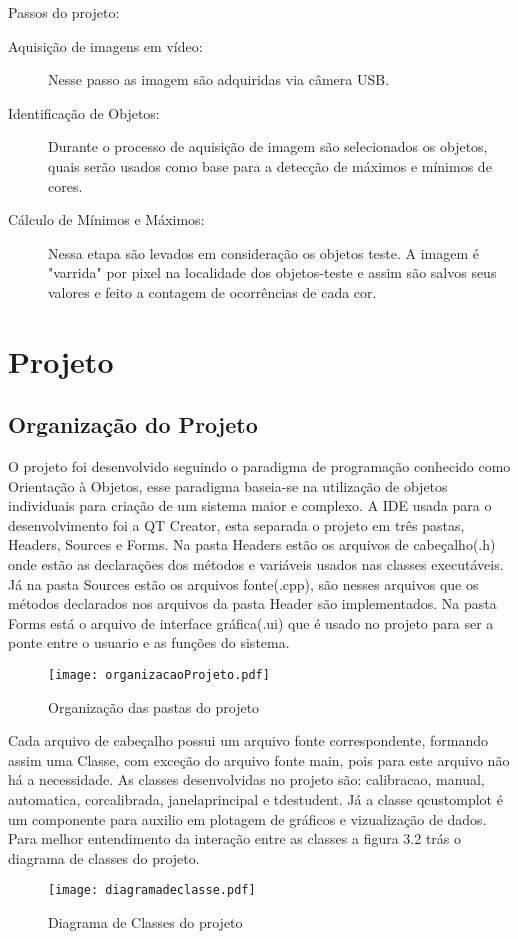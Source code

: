 	
	Passos do projeto:
	\begin{description}
		\item[Aquisição de imagens em vídeo:] Nesse passo as imagem são adquiridas via câmera USB.
		
		\item[Identificação de Objetos:]
				 Durante o processo de aquisição de imagem são selecionados os objetos, quais serão usados como base para a detecção de máximos e mínimos de cores.
		\item [Cálculo de Mínimos e Máximos:]
		 Nessa etapa são levados em consideração os objetos teste. A imagem é "varrida"  por pixel na localidade dos objetos-teste e assim são salvos seus valores e feito a contagem de ocorrências de cada cor.		
	\end{description}


	\section{Projeto}
	\subsection{Organização do Projeto}
	 O projeto foi desenvolvido seguindo o paradigma de programação conhecido como  Orientação à Objetos, esse paradigma baseia-se na utilização de objetos individuais para criação de um sistema maior e complexo. A IDE usada para o desenvolvimento foi a QT Creator, esta separada o projeto em três pastas, Headers, Sources e Forms. Na pasta Headers estão os arquivos de cabeçalho(.h) onde estão as declarações dos métodos e variáveis usados nas classes  executáveis. Já na pasta Sources estão os arquivos fonte(.cpp), são nesses arquivos que os métodos declarados nos arquivos da pasta Header são implementados. Na pasta Forms está o arquivo de interface gráfica(.ui) que é usado no projeto para ser a ponte entre o usuario e as funções do sistema.
	 
	\begin{figure}[!h]
		\centering
		\texttt{[image: organizacaoProjeto.pdf]}
		\caption{Organização das pastas do projeto}
		\label{Organizacao do Projeto}
	\end{figure}
	Cada arquivo de cabeçalho possui um arquivo fonte correspondente, formando assim uma Classe, com exceção do arquivo fonte main, pois para este arquivo não há a necessidade.
	As classes desenvolvidas no projeto são:
 calibracao, manual, automatica, corcalibrada, janelaprincipal e tdestudent. Já a classe qcustomplot é um componente para auxilio em plotagem de gráficos e vizualização de dados\cite{QCustomPlot}.
Para melhor entendimento da interação entre as classes a figura 3.2 trás o diagrama de classes do projeto.
	 \begin{figure}[!h]
	 	\centering
	 	\texttt{[image: diagramadeclasse.pdf]}
	 	\caption{Diagrama de Classes do projeto}
	 	\label{DiagramaDeClasse}
	 \end{figure}\newpage


